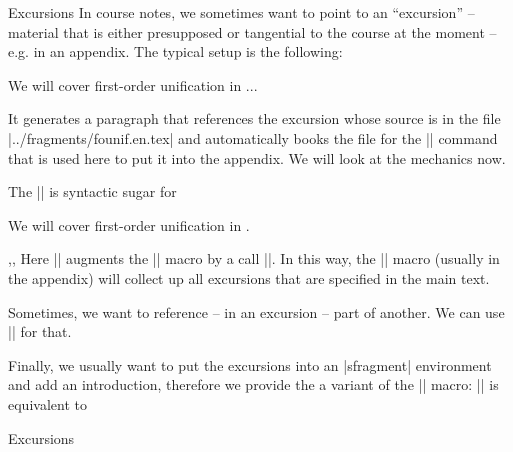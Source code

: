 \begin{sfragment}[id=sec:user:excursions]{Excursions}
In course notes, we sometimes want to point to an ``excursion'' -- material that is either
presupposed or tangential to the course at the moment -- e.g. in an appendix. The typical
setup is the following:

\begin{stexcode}
  {We will cover first-order unification in}
...
\begin{appendix}\printexcursions\end{appendix}
\end{stexcode}

It generates a paragraph that references the excursion whose source is in the file
|../fragments/founif.en.tex| and automatically books the file for the |\printexcursions|
command that is used here to put it into the appendix. We will look at the mechanics now. 

\begin{function}{\excursion}
  The || is syntactic sugar for

\begin{stexcode}
\begin{nparagraph}[title=Excursion]
  We will cover first-order unification in .
\end{nparagraph}
\end{stexcode}
\end{function}

\begin{function}{\activateexcursion,\printexcursion,\excursionref}
  Here || augments the |\printexcursions| macro by a call
  ||. In this way, the |\printexcursions| macro (usually in the
  appendix) will collect up all excursions that are specified in the main text.

  Sometimes, we want to reference -- in an excursion -- part of another. We can use
  || for that.
\end{function}

\begin{function}{\excursiongroup}
  Finally, we usually want to put the excursions into an |sfragment| environment and add
  an introduction, therefore we provide the a variant of the |\printexcursions| macro:
  |\excursiongroup[id=|\meta{id}|,intro=|\meta{path}|]| is equivalent to
\begin{stexcode}
\begin{note}
\begin{sfragment}[id=<id>]{Excursions}
  \printexcursions
\end{sfragment}
\end{note}
\end{stexcode}
\end{function}
\end{sfragment}

